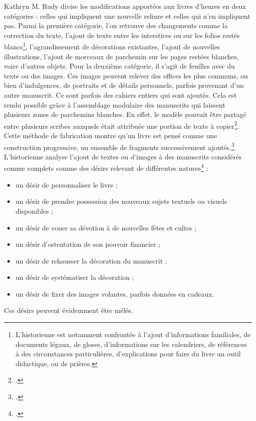 \documentclass[a4paper,12pt,twoside]{book}
\begin{document}
Kathryn M. Rudy divise les modifications apportées aux livres d'heures en deux catégories : celles qui impliquent une nouvelle reliure et celles qui n'en impliquent pas. Parmi la première catégorie, l'on retrouve des changements comme la correction du texte, l'ajout de texte entre les interstices ou sur les folios restés blancs\footnote{L'historienne est notamment confrontée à l'ajout d'informations familiales, de documents légaux, de gloses, d'informations sur les calendriers, de références à des circonstances particulières, d'explications pour faire du livre un outil didactique, ou de prières.}, l'agrandissement de décorations existantes, l'ajout de nouvelles illustrations, l'ajout de morceaux de parchemin sur les pages restées blanches, voire d'autres objets. Pour la deuxième catégorie, il s'agit de feuilles avec du texte ou des images. Ces images peuvent relever des offices les plus communs, ou bien d'indulgences, de portraits et de détails personnels, parfois provenant d'un autre manuscrit. Ce sont parfois des cahiers entiers qui sont ajoutés. Cela est rendu possible grâce à l'assemblage modulaire des manuscrits qui laissent plusieurs zones de parchemins blanches. En effet, le modèle pouvait être partagé entre plusieurs scribes auxquels était attribuée une portion de texte à copier\footcite[p. 89]{livre_medie}. Cette méthode de fabrication montre qu'un livre est pensé comme une construction progressive, un ensemble de fragments successivement ajoutés.\footcite[p. 9]{Piety_in_Pieces}. 
L'historienne analyse l'ajout de textes ou d'images à des manuscrits considérés comme complets comme des désirs relevant de différentes natures\footcite[p. 9]{Piety_in_Pieces} :
\begin{itemize}
    \item un désir de personnaliser le livre ;
    \item un désir de prendre possession des nouveaux sujets textuels ou visuels disponibles ;
    \item un désir de vouer sa dévotion à de nouvelles fêtes et cultes ;
    \item un désir d'ostentation de son pouvoir financier ;
    \item un désir de rehausser la décoration du manuscrit ;
    \item un désir de systématiser la décoration ;
    \item un désir de fixer des images volantes, parfois données en cadeaux. 
\end{itemize}
Ces désirs peuvent évidemment être mêlés. 
\end{document}

